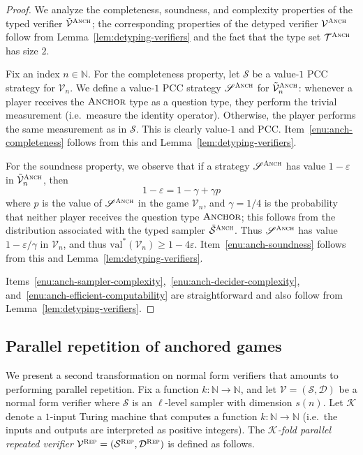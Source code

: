 \documentclass[11pt]{article}
\theoremstyle{definition}
\newcommand{\N}{\ensuremath{\mathbb{N}}}
\newcommand{\val}{\ensuremath{\mathrm{val}}}
\newcommand{\eps}{\varepsilon}
\newcommand{\sampler}{\mathcal{S}}
\newcommand{\decider}{\mathcal{D}}
\newcommand{\verifier}{\mathcal{V}}
\newcommand{\strategy}{\mathscr{S}}
\newcommand{\type}{\mathcal{T}}
\newcommand{\gamestyle}[1]{\ensuremath{\textsc{#1}}\xspace}
\newcommand{\typestyle}[1]{\ensuremath{\textsc{#1}}\xspace}
\newcommand{\Anchor}{\typestyle{Anchor}}
\renewcommand{\cal}[1]{\mathcal{#1}}
\newcommand{\anch}{\gamestyle{Anch}}
\newcommand{\rep}{\gamestyle{Rep}}
\begin{document}
\begin{proof}
  We analyze the completeness, soundness, and complexity properties of the typed
  verifier $\tilde{\verifier}^\anch$; the corresponding properties of the
  detyped verifier $\verifier^\anch$ follow from
  Lemma~\ref{lem:detyping-verifiers} and the fact that the type set
  $\type^\anch$ has size $2$.


  Fix an index $n \in \N$.
  For the completeness property, let $\strategy$ be a value-$1$ PCC strategy for
  $\verifier_n$.
  We define a value-$1$ PCC strategy $\strategy^\anch$ for
  $\tilde{\verifier}^\anch_n$: whenever a player receives the $\Anchor$ type as
  a question type, they perform the trivial measurement (i.e.\ measure the
  identity operator).
  Otherwise, the player performs the same measurement as in $\strategy$.
  This is clearly value-$1$ and PCC.
  Item~\ref{enu:anch-completeness} follows from this and
  Lemma~\ref{lem:detyping-verifiers}.

  For the soundness property, we observe that if a strategy $\strategy^\anch$
  has value $1 - \eps$ in $\tilde{\verifier}^\anch_n$, then
  \[
    1 - \eps = 1 - \gamma + \gamma p
  \]
  where $p$ is the value of $\strategy^\anch$ in the game $\verifier_n$, and
  $\gamma = 1/4$ is the probability that neither player receives the question
  type $\Anchor$; this follows from the distribution associated with the typed
  sampler $\tilde{\sampler}^\anch$.
  Thus $\strategy^\anch$ has value $1 - \eps/\gamma$ in $\verifier_n$, and thus
  $\val^*(\verifier_n) \geq 1 - 4\eps$.
  Item~\ref{enu:anch-soundness} follows from this and
  Lemma~\ref{lem:detyping-verifiers}.

  Items~\ref{enu:anch-sampler-complexity},~\ref{enu:anch-decider-complexity},
  and~\ref{enu:anch-efficient-computability} are straightforward and also follow
  from Lemma~\ref{lem:detyping-verifiers}.
\end{proof}

\subsection{Parallel repetition of anchored games} 
\label{sec:anchored-repetition}

We present a second transformation on normal form verifiers that amounts to
performing parallel repetition.
Fix a function $k:\N \to \N$, and let $\verifier = (\sampler,\decider)$ be a
normal form verifier where $\sampler$ is an $\ell$-level sampler with dimension
$s(n)$.
Let $\cal{K}$ denote a $1$-input Turing machine that computes a function $k: \N
\to \N$ (i.e.\ the inputs and outputs are interpreted as positive integers).
The \emph{$\cal{K}$-fold parallel repeated verifier} $\verifier^\rep =
(\sampler^\rep,\decider^\rep)$ is defined as follows.
\end{document}
